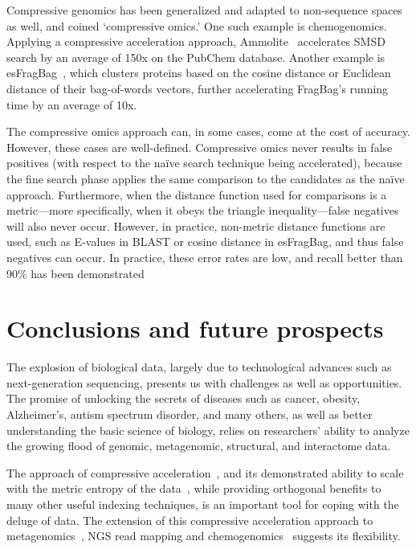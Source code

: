 \documentclass{acm_proc_article-sp}
\begin{document}
Compressive genomics \cite{loh2012compressive} has been
generalized and adapted to non-sequence spaces as well, and coined
`compressive omics.'
One such example is chemogenomics.
Applying a compressive acceleration approach, Ammolite~\cite{yu2015entropy}
accelerates SMSD search by an average of 150x on the PubChem database.
Another example is 
esFragBag~\cite{yu2015entropy}, which clusters proteins based on the cosine distance or
Euclidean distance of their bag-of-words vectors, further accelerating FragBag's
running time by an average of 10x.

The compressive omics approach can, in some cases, come at the cost of accuracy.
However, these cases are well-defined.
Compressive omics never results in false positives (with respect to the na\"ive 
search technique being accelerated), because the fine search phase applies the
same comparison to the candidates as the na\"ive approach.
Furthermore, when the distance function used for comparisons is a metric---more specifically, when it obeys the triangle inequality---false negatives will also
never occur.
However, in practice, non-metric distance functions are used, such as E-values
in BLAST or cosine distance in esFragBag, and thus false negatives can occur.
In practice, these error rates are low, and recall better than 90\% has been
demonstrated~\cite{loh2012compressive,daniels2013compressive,yu2015entropy}

\section{Conclusions and future prospects}

The explosion of biological data, largely due to technological advances such as
next-generation sequencing, presents us with challenges as well as 
opportunities.
The promise of unlocking the secrets of diseases such as cancer, obesity,
Alzheimer's, autism spectrum disorder, and many others, as well as better 
understanding the basic science of biology, relies on researchers' ability to 
analyze the growing flood of genomic, metagenomic, structural, and interactome 
data.

The approach of compressive acceleration~\cite{loh2012compressive}, and its 
demonstrated ability to scale with the metric entropy of the 
data~\cite{yu2015entropy}, while providing orthogonal benefits to many other
useful indexing techniques, is an important tool for coping with the deluge of
data.
The extension of this compressive acceleration approach to 
metagenomics~\cite{yu2015entropy}, NGS read 
mapping and chemogenomics~\cite{yorukoglu2015compressive} suggests its 
flexibility.
\end{document}
